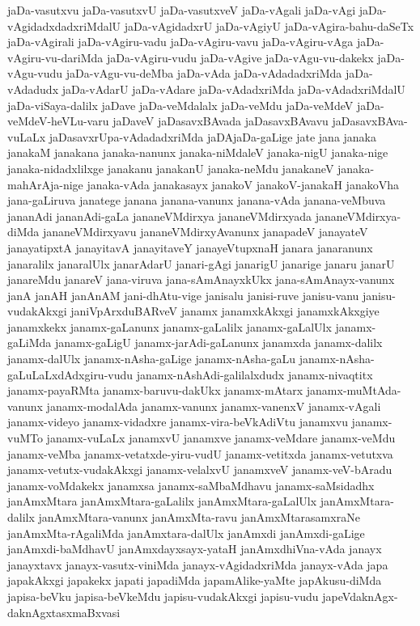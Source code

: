 {jaDa-vasutxvu
jaDa-vasutxvU
jaDa-vasutxveV
jaDa-vAgali
jaDa-vAgi
jaDa-vAgidadxdadxriMdalU
jaDa-vAgidadxrU
jaDa-vAgiyU
jaDa-vAgira-bahu-daSeTx
jaDa-vAgirali
jaDa-vAgiru-vadu
jaDa-vAgiru-vavu
jaDa-vAgiru-vAga
jaDa-vAgiru-vu-dariMda
jaDa-vAgiru-vudu
jaDa-vAgive
jaDa-vAgu-vu-dakekx
jaDa-vAgu-vudu
jaDa-vAgu-vu-deMba
jaDa-vAda
jaDa-vAdadadxriMda
jaDa-vAdadudx
jaDa-vAdarU
jaDa-vAdare
jaDa-vAdadxriMda
jaDa-vAdadxriMdalU
jaDa-viSaya-dalilx
jaDave
jaDa-veMdalalx
jaDa-veMdu
jaDa-veMdeV
jaDa-veMdeV-heVLu-varu
jaDaveV
jaDasavxBAvada
jaDasavxBAvavu
jaDasavxBAva-vuLaLx
jaDasavxrUpa-vAdadadxriMda
jaDAjaDa-gaLige
jate
jana
janaka
janakaM
janakana
janaka-nanunx
janaka-niMdaleV
janaka-nigU
janaka-nige
janaka-nidadxlilxge
janakanu
janakanU
janaka-neMdu
janakaneV
janaka-mahArAja-nige
janaka-vAda
janakasayx
janakoV
janakoV-janakaH
janakoVha
jana-gaLiruva
janatege
janana
janana-vanunx
janana-vAda
janana-veMbuva
jananAdi
jananAdi-gaLa
jananeVMdirxya
jananeVMdirxyada
jananeVMdirxya-diMda
jananeVMdirxyavu
jananeVMdirxyAvanunx
janapadeV
janayateV
janayatipxtA
janayitavA
janayitaveY
janayeVtupxnaH
janara
janaranunx
janaralilx
janaralUlx
janarAdarU
janari-gAgi
janarigU
janarige
janaru
janarU
janareMdu
janareV
jana-viruva
jana-sAmAnayxkUkx
jana-sAmAnayx-vanunx
janA
janAH
janAnAM
jani-dhAtu-vige
janisalu
janisi-ruve
janisu-vanu
janisu-vudakAkxgi
janiVpArxduBARveV
janamx
janamxkAkxgi
janamxkAkxgiye
janamxkekx
janamx-gaLanunx
janamx-gaLalilx
janamx-gaLalUlx
janamx-gaLiMda
janamx-gaLigU
janamx-jarAdi-gaLanunx
janamxda
janamx-dalilx
janamx-dalUlx
janamx-nAsha-gaLige
janamx-nAsha-gaLu
janamx-nAsha-gaLuLaLxdAdxgiru-vudu
janamx-nAshAdi-galilalxdudx
janamx-nivaqtitx
janamx-payaRMta
janamx-baruvu-dakUkx
janamx-mAtarx
janamx-muMtAda-vanunx
janamx-modalAda
janamx-vanunx
janamx-vanenxV
janamx-vAgali
janamx-videyo
janamx-vidadxre
janamx-vira-beVkAdiVtu
janamxvu
janamx-vuMTo
janamx-vuLaLx
janamxvU
janamxve
janamx-veMdare
janamx-veMdu
janamx-veMba
janamx-vetatxde-yiru-vudU
janamx-vetitxda
janamx-vetutxva
janamx-vetutx-vudakAkxgi
janamx-velalxvU
janamxveV
janamx-veV-bAradu
janamx-voMdakekx
janamxsa
janamx-saMbaMdhavu
janamx-saMsidadhx
janAmxMtara
janAmxMtara-gaLalilx
janAmxMtara-gaLalUlx
janAmxMtara-dalilx
janAmxMtara-vanunx
janAmxMta-ravu
janAmxMtarasamxraNe
janAmxMta-rAgaliMda
janAmxtara-dalUlx
janAmxdi
janAmxdi-gaLige
janAmxdi-baMdhavU
janAmxdayxsayx-yataH
janAmxdhiVna-vAda
janayx
janayxtavx
janayx-vasutx-viniMda
janayx-vAgidadxriMda
janayx-vAda
japa
japakAkxgi
japakekx
japati
japadiMda
japamAlike-yaMte
japAkusu-diMda
japisa-beVku
japisa-beVkeMdu
japisu-vudakAkxgi
japisu-vudu
japeVdaknAgx-daknAgxtasxmaBxvasi
}
